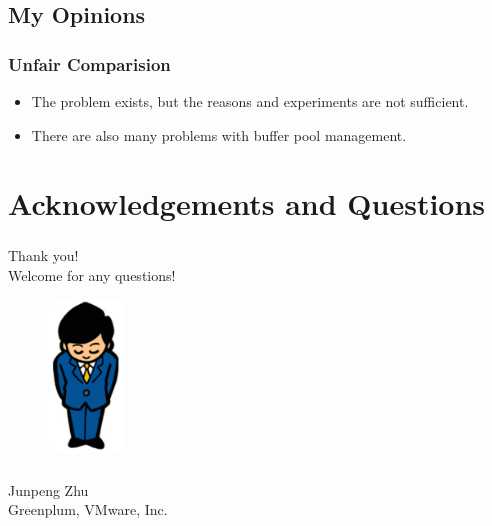 \documentclass[10pt,svgnames,fragile]{beamer}
\begin{document}
\subsection{My Opinions}
\begin{frame}
	\frametitle{Unfair Comparision}
	\begin{itemize}
		\item The problem exists, but the reasons and experiments are not sufficient.
		\item There are also many problems with buffer pool management.
	\end{itemize}
\end{frame}

\section{Acknowledgements and Questions}
\begin{frame}
	\frametitle{}
	\begin{center}
		Thank you! \\
		Welcome for any questions!
	\end{center}
	\begin{figure}
		\includegraphics[width=2cm]{images/thanks.png}
	\end{figure}
	\frametitle{}
	\begin{center}
		Junpeng Zhu \\
		Greenplum, VMware, Inc.
	\end{center}
\end{frame}
\end{document}
